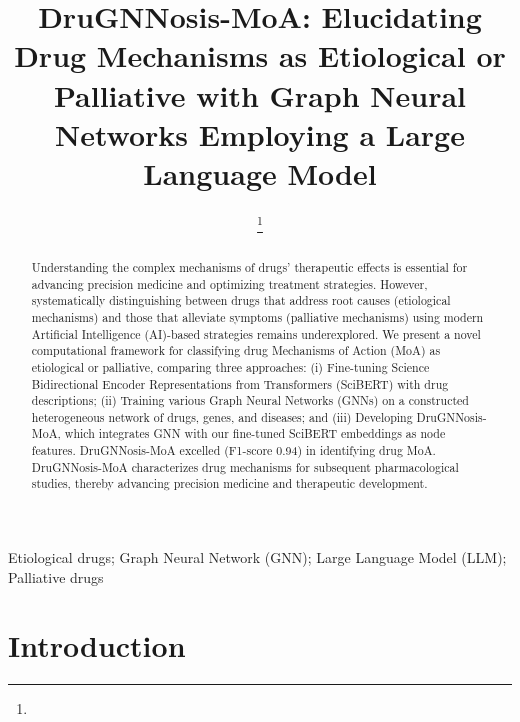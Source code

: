 \documentclass[journal,twoside,web]{ieeecolor}
\begin{document}
\title{DruGNNosis-MoA: Elucidating Drug Mechanisms as Etiological or Palliative with Graph Neural Networks Employing a Large Language Model}
\author{
\thanks{
}
}
\maketitle






\begin{abstract}
Understanding the complex mechanisms of drugs' therapeutic effects is essential for advancing precision medicine and optimizing treatment strategies. 
However, systematically distinguishing between drugs that address root causes (etiological mechanisms) and those that alleviate symptoms (palliative mechanisms) using modern Artificial Intelligence (AI)-based strategies remains underexplored.
We present a novel computational framework for classifying drug Mechanisms of Action (MoA) as etiological or palliative, comparing three approaches: 
(i) Fine-tuning Science Bidirectional Encoder Representations from Transformers (SciBERT) with drug descriptions; 
(ii) Training various Graph Neural Networks (GNNs) on a constructed heterogeneous network of drugs, genes, and diseases; and 
(iii) Developing DruGNNosis-MoA, which integrates GNN with our fine-tuned SciBERT embeddings as node features. 
DruGNNosis-MoA excelled (F1-score 0.94) in identifying drug MoA. 
DruGNNosis-MoA characterizes drug mechanisms for subsequent pharmacological studies, thereby advancing precision medicine and therapeutic development.
\end{abstract}

\begin{IEEEkeywords}
Etiological drugs;
Graph Neural Network (GNN);
Large Language Model (LLM);
Palliative drugs
\end{IEEEkeywords}

\section{Introduction}
\label{sec:intro}
\end{document}

